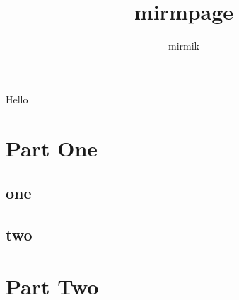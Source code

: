 \documentclass[russian,]{report}
\title{mirmpage}
\author{mirmik}
\begin{document}
Hello

\part*{Part One}
\chapter*{one}

\chapter*{two}


\part*{Part Two}



\tableofcontents
\end{document}
